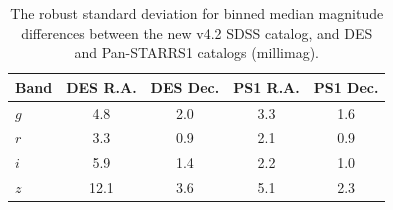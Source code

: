 \documentclass[fleqn,usenatbib]{mnras}
\begin{document}
   
\begin{table}
	\centering
	\caption{The robust standard deviation for binned median magnitude differences between
the new v4.2 SDSS catalog, and DES and Pan-STARRS1 catalogs (millimag).}
	\label{tab:DESPS1}
	\begin{tabular}{l|c|c|c|c} %
		\hline
		Band & DES R.A. & DES Dec. & PS1 R.A. & PS1 Dec. \\
		\hline
       $g$        &        4.8    &      2.0   &        3.3    &      1.6        \\
       $r$         &        3.3    &      0.9   &        2.1    &      0.9         \\  
       $i$         &        5.9    &      1.4   &        2.2    &      1.0         \\ 
       $z$        &       12.1    &     3.6   &        5.1    &      2.3         \\ 
		\hline
	\end{tabular}
\end{table}
\end{document}
